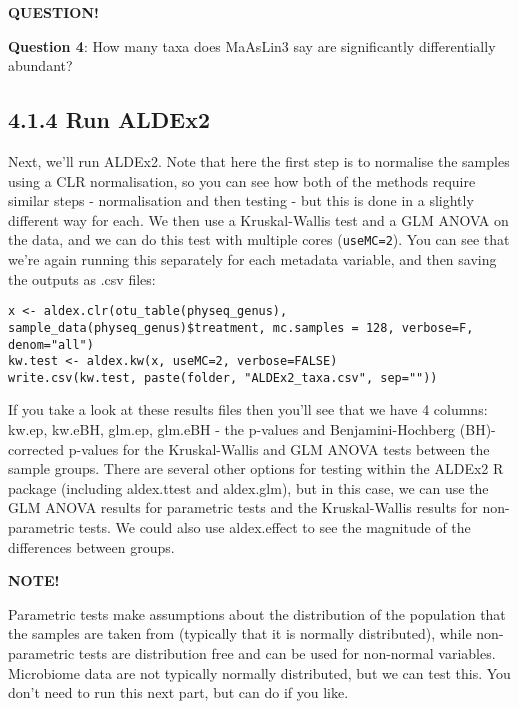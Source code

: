 \documentclass[
]{book}
\newenvironment{bluebox}{
  \definecolor{shadecolor}{RGB}{172, 210, 237}
  \color{white}
  \begin{shaded}}
 {\end{shaded}}
\newenvironment{greenbox}{
  \definecolor{shadecolor}{RGB}{141, 181, 128}
  \color{white}
  \begin{shaded}}
 {\end{shaded}}
\begin{document}
\begin{bluebox}

\begin{center}
\textbf{QUESTION!}

\end{center}

\textbf{Question 4}: How many taxa does MaAsLin3 say are significantly differentially abundant?

\end{bluebox}

\subsection{4.1.4 Run ALDEx2}\label{run-aldex2}

Next, we'll run ALDEx2. Note that here the first step is to normalise the samples using a CLR normalisation, so you can see how both of the methods require similar steps - normalisation and then testing - but this is done in a slightly different way for each. We then use a Kruskal-Wallis test and a GLM ANOVA on the data, and we can do this test with multiple cores (\texttt{useMC=2}). You can see that we're again running this separately for each metadata variable, and then saving the outputs as .csv files:

\begin{verbatim}
x <- aldex.clr(otu_table(physeq_genus), sample_data(physeq_genus)$treatment, mc.samples = 128, verbose=F, denom="all")
kw.test <- aldex.kw(x, useMC=2, verbose=FALSE)
write.csv(kw.test, paste(folder, "ALDEx2_taxa.csv", sep=""))
\end{verbatim}

If you take a look at these results files then you'll see that we have 4 columns: kw.ep, kw.eBH, glm.ep, glm.eBH - the p-values and Benjamini-Hochberg (BH)-corrected p-values for the Kruskal-Wallis and GLM ANOVA tests between the sample groups. There are several other options for testing within the ALDEx2 R package (including aldex.ttest and aldex.glm), but in this case, we can use the GLM ANOVA results for parametric tests and the Kruskal-Wallis results for non-parametric tests. We could also use aldex.effect to see the magnitude of the differences between groups.

\begin{greenbox}

\begin{center}
\textbf{NOTE!}

\end{center}

Parametric tests make assumptions about the distribution of the population that the samples are taken from (typically that it is normally distributed), while non-parametric tests are distribution free and can be used for non-normal variables. Microbiome data are not typically normally distributed, but we can test this. You don't need to run this next part, but can do if you like.

\end{greenbox}
\end{document}

